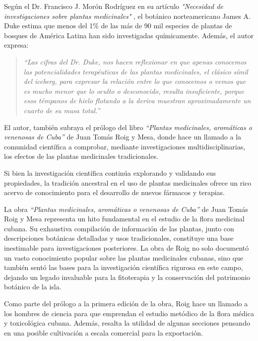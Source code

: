 Según el Dr. Francisco J. Morón Rodríguez en su artículo 
\textit{"Necesidad de investigaciones sobre plantas medicinales"} \cite{Moron2007}, 
el botánico norteamericano James A. Duke estima que menos del 1\% de las más de 90 mil especies 
de plantas de bosques de América Latina han sido investigadas químicamente. Además, el autor expresa:

\begin{quote}
    \textit{``Las cifras del Dr. Duke, nos hacen reflexionar  en que
    apenas conocemos las potencialidades terapéuticas de las plantas
    medicinales, el clásico símil del iceberg, para expresar la relación entre
    lo que conocemos o vemos que es mucho menor que lo oculto o desconocido,
    resulta insuficiente, porque esos témpanos de hielo flotando a la deriva
    muestran aproximadamente un cuarto de su masa total.''}
\end{quote}

El autor, también subraya el prólogo del libro \textit{``Plantas medicinales, aromáticas o venenosas de Cuba''} \cite{Roig1945}
de Juan Tomás Roig y Mesa, donde hace un llamado a la comunidad científica a comprobar, 
mediante investigaciones multidisciplinarias, los efectos de las plantas medicinales tradicionales.

Si bien la investigación científica continúa explorando y validando sus propiedades, 
la tradición ancestral en el uso de plantas medicinales ofrece un rico acervo de conocimiento 
para el desarrollo de nuevos fármacos y terapias.

La obra \textit{``Plantas medicinales, aromáticas o venenosas de Cuba''} \cite{Roig1945} de Juan Tomás Roig y Mesa 
representa un hito fundamental en el estudio de la flora medicinal cubana. 
Su exhaustiva compilación de información de las plantas, junto con descripciones botánicas 
detalladas y usos tradicionales, constituye una base inestimable para investigaciones 
posteriores. La obra de Roig no solo documentó un vasto conocimiento popular sobre las plantas 
medicinales cubanas, sino que también sentó las bases para la investigación científica 
rigurosa en este campo, dejando un legado invaluable para la fitoterapia y la conservación 
del patrimonio botánico de la isla.

Como parte del prólogo a la primera edición de la obra, Roig hace un llamado a los hombres 
de ciencia para que emprendan el estudio metódico de la flora médica y toxicológica cubana. 
Además, resalta la utilidad de algunas secciones pensando en una posible cultivación a escala 
comercial para la exportación.

